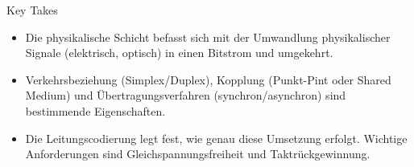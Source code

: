 \begin{KR}{Key Takes}
    \begin{itemize}
        \item Die physikalische Schicht befasst sich mit der Umwandlung physikalischer Signale (elektrisch, optisch) in einen Bitstrom und umgekehrt.
        \item Verkehrsbeziehung (Simplex/Duplex), Kopplung (Punkt-Pint oder Shared Medium) und Übertragungsverfahren (synchron/asynchron) sind bestimmende Eigenschaften.
        \item Die Leitungscodierung legt fest, wie genau diese Umsetzung erfolgt. Wichtige Anforderungen sind Gleichspannungsfreiheit und Taktrückgewinnung.
    \end{itemize}
\end{KR}